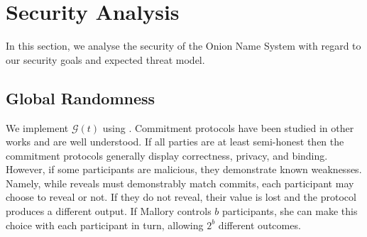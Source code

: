 \documentclass[USenglish,oneside,twocolumn]{article}
\begin{document}
%
%
%
%

\section{Security Analysis}
\label{sec:Analysis}

In this section, we analyse the security of the Onion Name System with regard to our security goals and expected threat model. 

\subsection{Global Randomness}
\label{sec:GlobalRand}

We implement $ \mathcal{G}(t) $ using \cite{GouletCommitReveal}. Commitment protocols have been studied in other works \cite{rivest1999unconditionally, naor1990bit} and are well understood. If all parties are at least semi-honest then the commitment protocols generally display correctness, privacy, and binding. However, if some participants are malicious, they demonstrate known weaknesses. Namely, while reveals must demonstrably match commits, each participant may choose to reveal or not. If they do not reveal, their value is lost and the protocol produces a different output. If Mallory controls $ b $ participants, she can make this choice with each participant in turn, allowing $ 2^{b} $ different outcomes.
\end{document}
